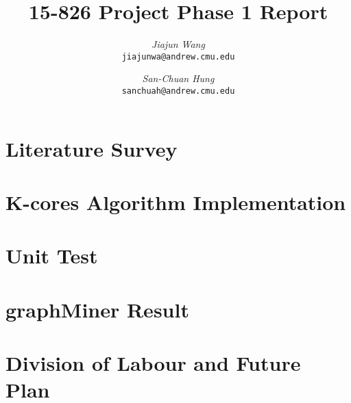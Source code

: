 \documentclass[12pt]{article}
\begin{document}
\newcommand{\beq}{\begin{equation}}
\newcommand{\eeq}{\end{equation}}
\newcommand{\bit}{\begin{itemize*}}
\newcommand{\eit}{\end{itemize*}}
\newcommand{\goal}[1]{ {\noindent {$\Rightarrow$} \em {#1} } }
\newcommand{\hide}[1]{}
\newcommand{\comment}[1]{ {\footnotesize {#1} } }
\newtheorem{lemma}{Lemma}
\newtheorem{theorem}{Theorem}
\newtheorem{proof}{Proof}
\newtheorem{defn}{Definition}
\newtheorem{algo}{Algorithm}
\newtheorem{observation}{Observation}

\title{15-826 Project Phase 1 Report}


\author{ {\em Jiajun Wang} \\
	    {\tt jiajunwa@andrew.cmu.edu}
	 \and
	 {\em San-Chuan Hung} \\
	     {\tt sanchuah@andrew.cmu.edu}
}

\maketitle
\section{Literature Survey}
    \label{sec:survey}
    

\section{K-cores Algorithm Implementation}
    \label{sec:kcor}
    

\section{Unit Test}
    \label{sec:unittest}
    

\section{graphMiner Result}
    \label{sec:graphminer}
    
    
\section{Division of Labour and Future Plan}
    \label{sec:divisionoflabour}
    



\end{document}
